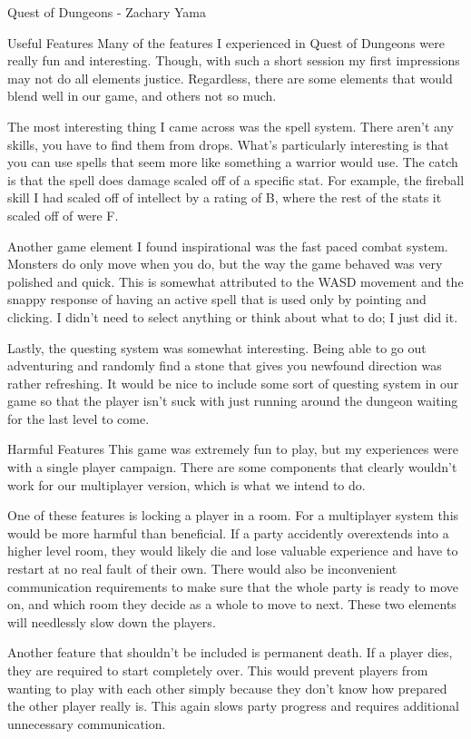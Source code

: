 \documentclass[12pt]{report}
\begin{document}
\begin{section}{Quest of Dungeons - Zachary Yama}
\begin{subsection}{Useful Features}
Many of the features I experienced in Quest of Dungeons were really fun and
interesting. Though, with such a short session my first impressions may not
do all elements justice. Regardless, there are some elements that would
blend well in our game, and others not so much.
 
The most interesting thing I came across was the spell system. There aren’t
any skills, you have to find them from drops. What’s particularly
interesting is that you can use spells that seem more like something a
warrior would use. The catch is that the spell does damage scaled off of a
specific stat. For example, the fireball skill I had scaled off of
intellect by a rating of B, where the rest of the stats it scaled off of
were F.
 
Another game element I found inspirational was the fast paced combat
system. Monsters do only move when you do, but the way the game behaved was
very polished and quick. This is somewhat attributed to the WASD movement
and the snappy response of having an active spell that is used only by
pointing and clicking. I didn’t need to select anything or think about what
to do; I just did it.

Lastly, the questing system was somewhat interesting. Being able to go out
adventuring and randomly find a stone that gives you newfound direction was
rather refreshing. It would be nice to include some sort of questing system
in our game so that the player isn’t suck with just running around the
dungeon waiting for the last level to come.  
\end{subsection}
 
\begin{subsection}{Harmful Features}
This game was extremely fun to play, but my experiences were with a single
player campaign. There are some components that clearly wouldn’t work for
our multiplayer version, which is what we intend to do.
 
One of these features is locking a player in a room. For a multiplayer
system this would be more harmful than beneficial. If a party accidently
overextends into a higher level room, they would likely die and 
lose valuable experience and have to restart at no real fault of their own.
There would also be inconvenient communication requirements to make sure
that the whole party is ready to move on, and which room they decide as a
whole to move to next. These two elements will needlessly slow down the
players.
 
Another feature that shouldn’t be included is permanent death. If a player
dies, they are required to start completely over. This would prevent
players from wanting to play with each other simply because they don’t
know how prepared the other player really is. This again slows party
progress and requires additional unnecessary communication.
\end{subsection}
\end{section}
\end{document}

